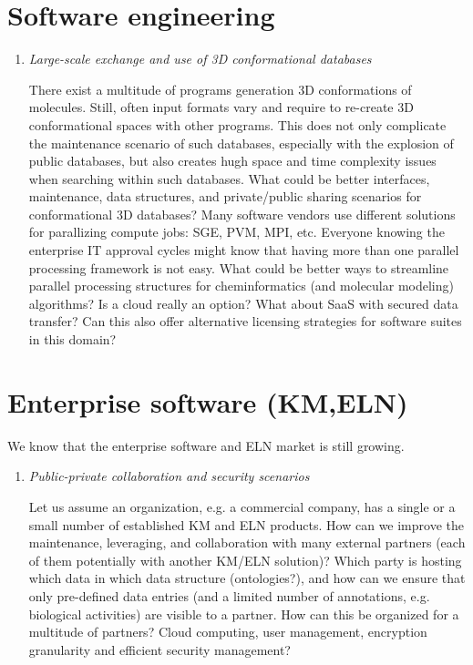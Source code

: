 \documentclass{sig-alternate}
\begin{document}
\section*{Software engineering}
\begin{enumerate}
\item \emph{Large-scale exchange and use of 3D conformational databases}

There exist a multitude of programs generation 3D conformations of molecules. Still, often input formats vary and require
to re-create 3D conformational spaces with other programs. This does not only complicate the maintenance scenario of such
databases, especially with the explosion of public databases, but also creates hugh space and time complexity issues when
searching within such databases. What could be better interfaces, maintenance, data structures, and private/public sharing
scenarios for conformational 3D databases? 
Many software vendors use different solutions for parallizing compute jobs: SGE, PVM, MPI, etc. 
Everyone knowing the enterprise IT approval cycles might know that having more than one parallel processing framework 
is not easy. What could be better ways to streamline parallel processing structures for 
cheminformatics (and molecular modeling) algorithms? Is a cloud really an option? What about SaaS with secured data transfer?
Can this also offer alternative licensing strategies for software suites in this domain?
\end{enumerate}

\section*{Enterprise software (KM,ELN)}
We know that the enterprise software and ELN market is still growing.
\begin{enumerate}
\item \emph{Public-private collaboration and security scenarios}

Let us assume an organization, e.g. a commercial company, has a single or a small number of established KM and ELN products. 
How can we improve the maintenance, leveraging, and collaboration with many external partners (each of them potentially
with another KM/ELN solution)? Which party is hosting which data in which data structure (ontologies?), and 
how can we ensure that only pre-defined data entries 
(and a limited number of annotations, e.g. biological activities) are visible to a partner.
How can this be organized for a multitude of partners? Cloud computing, user management, encryption granularity and efficient security management?
\end{enumerate}



\end{document}
